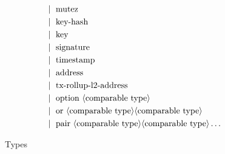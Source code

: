 \documentclass[a4paper,UKenglish]{dagrep-v2021}
\begin{document}
\begin{figure} []
\begin{align*}
   &\mid\ \text{mutez}\\
   &\mid\ \text{key-hash}\\
   &\mid\ \text{key}\\
   &\mid\ \text{signature}\\
   &\mid\ \text{timestamp}\\
   &\mid\ \text{address}\\
   &\mid\ \text{tx-rollup-l2-address}\\
   &\mid\ \text{option}\ \langle\text{comparable type}\rangle\\
   &\mid\ \text{or}\ \langle\text{comparable type}\rangle \langle\text{comparable type}\rangle\\
   &\mid\ \text{pair}\ \langle\text{comparable type}\rangle \langle\text{comparable type}\rangle \dots \\
\end{align*}
\caption{Types}
\label{fig:type}
\end{figure}
\end{document}
